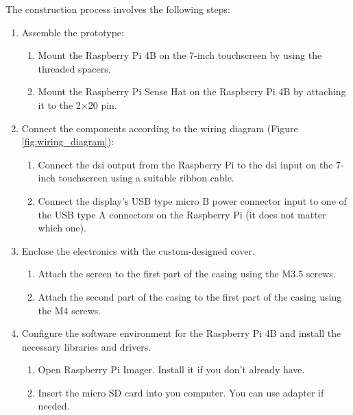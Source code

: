\documentclass[../main.tex]{subfiles}
\begin{document}
    \clearpage

    The construction process involves the following steps:

    \begin{enumerate}
        \item Assemble the prototype:
        \begin{enumerate}
            \item Mount the Raspberry Pi 4B on the 7-inch touchscreen by using the threaded spacers.
            \item Mount the Raspberry Pi Sense Hat on the Raspberry Pi 4B by attaching it to the 2$\times$20 pin.
        \end{enumerate}
        
        \item Connect the components according to the wiring diagram (Figure \ref{fig:wiring_diagram}):
        \begin{enumerate}
            \item Connect the \gls{dsi} output from the Raspberry Pi to the \gls{dsi} input on the 7-inch touchscreen using a suitable ribbon cable.
            \item Connect the display's USB type micro B power connector input to one of the USB type A connectors on the Raspberry Pi (it does not matter which one).
        \end{enumerate}

        \item Enclose the electronics with the custom-designed cover.
        \begin{enumerate}
            \item Attach the screen to the first part of the casing using the M3.5 screws.
            \item{Attach the second part of the casing to the first part of the casing using the M4 screws.}
        \end{enumerate}
        
        \item Configure the software environment for the Raspberry Pi 4B and install the necessary libraries and drivers.
        \begin{enumerate}
            \item Open Raspberry Pi Imager. Install it if you don't already have.
            
            \item Insert the micro SD card into you computer. You can use adapter if needed.
            

\end{enumerate}
\end{enumerate}
\end{document}

